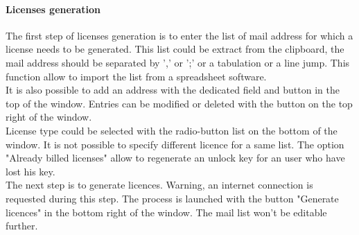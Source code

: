 \paragraph{Licenses generation}

The first step of licenses generation is to enter the list of mail address for which a license needs to be generated. This list could be extract from the clipboard, the mail address should be separated by ',' or ';' or a tabulation or a line jump. This function allow to import the list from a spreadsheet software.\\

It is also possible to add an address with the dedicated field and button in the top of the window. Entries can be modified or deleted with the button on the top right of the window.\\

License type could be selected with the radio-button list on the bottom of the window. It is not possible to specify different licence for a same list. The option "Already billed licenses" allow to regenerate an unlock key for an user who have lost his key.\\

The next step is to generate licences. Warning, an internet connection is requested during this step. The process is launched with the button "Generate licences" in the bottom right of the window. The mail list won't be editable further.\\

